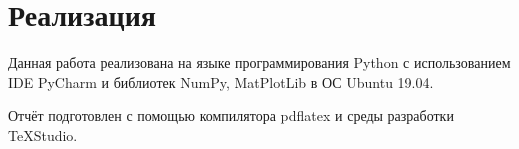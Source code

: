 \section{Реализация}
Данная работа реализована на языке программирования Python с использованием IDE PyCharm и библиотек NumPy, MatPlotLib в ОС Ubuntu 19.04.

Отчёт подготовлен с помощью компилятора pdflatex и среды разработки TeXStudio.